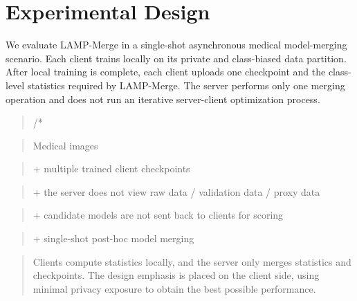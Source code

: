 \documentclass[letterpaper]{article}
\begin{document}
\section{Experimental Design}

We evaluate LAMP-Merge in a single-shot asynchronous medical model-merging scenario. Each client trains locally on its private and class-biased data partition. After local training is complete, each client uploads one checkpoint and the class-level statistics required by LAMP-Merge. The server performs only one merging operation and does not run an iterative server-client optimization process.


\begin{quote}\small /*\end{quote}

\begin{quote}\small Medical images\end{quote}

\begin{quote}\small + multiple trained client checkpoints\end{quote}

\begin{quote}\small + the server does not view raw data / validation data / proxy data\end{quote}

\begin{quote}\small + candidate models are not sent back to clients for scoring\end{quote}

\begin{quote}\small + single-shot post-hoc model merging\end{quote}

\begin{quote}\small Clients compute statistics locally, and the server only merges statistics and checkpoints. The design emphasis is placed on the client side, using minimal privacy exposure to obtain the best possible performance.\end{quote}
\end{document}
